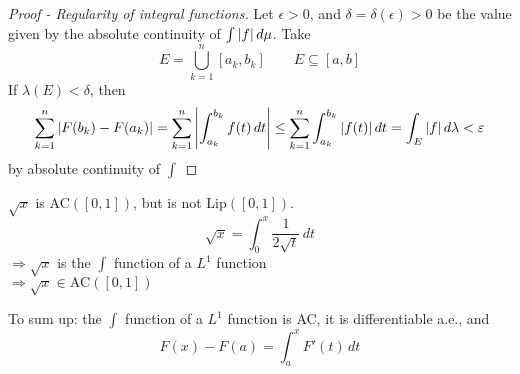 \begin{proof}[Proof - Regularity of integral functions]
    Let \(\epsilon > 0\), and \(\delta = \delta(\epsilon) > 0\) be the value given by the absolute continuity of \(\int \abs{f} \, d\mu\). 
    Take 
    \[
        E = \bigcup_{k=1}^n \left[ a_k, b_k \right] \qquad E \subseteq \left[a, b\right]
    \]
    If \(\lambda(E) < \delta\), then
    \[
        \sum_{k=1}^n \abs{F(b_k) - F(a_k)} = \sum_{k=1}^n \abs{\int_{a_k}^{b_k} f(t)\, dt} 
        \leq \sum_{k=1}^n \int_{a_k}^{b_k} \abs{f(t)}\, dt
        = \int_E \abs{f} \, d\lambda < \varepsilon
    \]
    by absolute continuity of \(\int\) 
\end{proof}
\begin{remark}
    \(\sqrt{x}\) is AC\((\left[0, 1\right])\), but is not Lip\((\left[0, 1\right])\).
    \[
        \sqrt{x} = \int_0^x \frac{1}{2\sqrt{t}} \, dt
    \]
    \(\Rightarrow \sqrt{x}\) is the \(\int\) function of a \(L^1\) function \\
    \(\Rightarrow \sqrt{x} \in \text{AC}(\left[0, 1\right])\)
\end{remark}

To sum up: the \(\int \) function of a \(L^1\) function is AC, it is differentiable a.e., and 
\[
    F(x) - F(a) = \int_a^x F'(t) \, dt \tag*{FC}
\]

